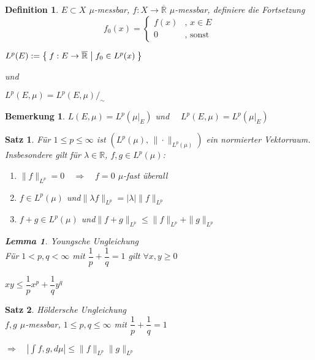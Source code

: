 \documentclass[11pt]{memoir}
\theoremstyle{changebreak}
\newtheorem{Definition}{Definition}[chapter]
\newtheorem{Bemerkung}{Bemerkung}[chapter]
\newtheorem{Lemma}{Lemma}[chapter]
\newtheorem{Satz}{Satz}[chapter]
\begin{document}
\begin{Definition}
$E \subset X$ $\mu$-messbar, $f: X \rightarrow \overline{\mathbb R}$ $\mu$-messbar, definiere die Fortsetzung
\begin{equation}
f_0(x) =
\begin{cases}
	f(x) & ,\, x \in E \\
	0 & \text{, sonst}
\end{cases}
\end{equation}
\begin{center}
	$L^p(E) := \Set{f: E \rightarrow \overline{\mathbb R} |f_0 \in L^p(x)}$
\end{center}
und
\begin{center}
	$L^p(E, \mu) = L^p(E, \mu)/_\sim$
\end{center}
\end{Definition}

\begin{Bemerkung}
$L(E, \mu) = L^p(\mu\vert_E)$ \quad und $ \quad L^p(E, \mu) = L^p(\mu\vert_E)$
\end{Bemerkung}

\begin{Satz}
Für $1 \leq p \leq \infty$ ist $(L^p(\mu),\, \|\cdotp\|_{L^p(\mu)})$ ein normierter Vektorraum. Insbesondere gilt für $\lambda \in \mathbb R$, $f, g \in L^p(\mu)$:
\begin{enumerate}
	\item $\|f\|_{L^p} = 0 \quad \Rightarrow\quad  f=0$ $\mu$-fast überall
	\item $f \in L^p(\mu)$ \quad und\quad $\|\lambda f\|_{L^p} = |\lambda|\|f\|_{L^p}$
	\item $f +g \in L^p(\mu)$ \quad und\quad  $\|f + g\|_{L^p} \leq \|f\|_{L^p} + \|g\|_{L^p}$
\end{enumerate}

\begin{Lemma}
\emph{Youngsche Ungleichung} \\
Für $1 < p, q < \infty$ mit $\dfrac{1}{p}+\dfrac{1}{q} =1$ gilt $\forall x, y \geq 0$
\begin{center}
	$xy \leq \dfrac{1}{p}x^p + \dfrac{1}{q}y^q$
\end{center}
\end{Lemma}
\end{Satz}

\begin{Satz}
\emph{Höldersche Ungleichung} \\
$f, g$ $\mu$-messbar, $1 \leq p, q \leq \infty$ mit $\dfrac{1}{p}+\dfrac{1}{q} =1$ \\
\begin{center}
	$\Rightarrow \quad \left| \int f, g, d\mu\right| \leq \|f\|_{L^p}\|g\|_{L^p}$
\end{center}
\end{Satz}
\end{document}
